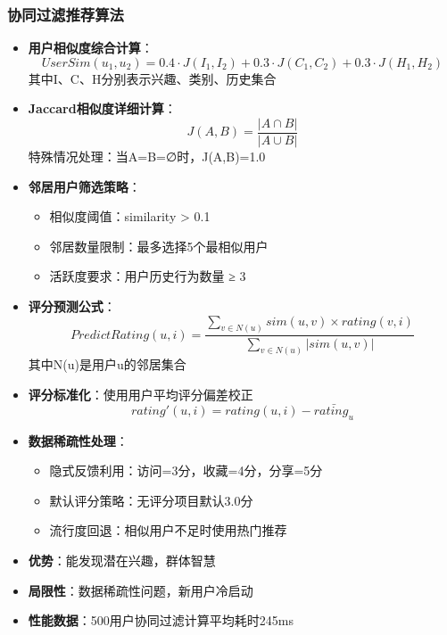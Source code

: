 \documentclass[12pt,a4paper]{article}
\begin{document}
\subsubsection{协同过滤推荐算法}
\begin{itemize}
    \item \textbf{用户相似度综合计算}：
    \[UserSim(u_1, u_2) = 0.4 \cdot J(I_1, I_2) + 0.3 \cdot J(C_1, C_2) + 0.3 \cdot J(H_1, H_2)\]
    其中I、C、H分别表示兴趣、类别、历史集合
    \item \textbf{Jaccard相似度详细计算}：
    \[J(A,B) = \frac{|A \cap B|}{|A \cup B|}\]
    特殊情况处理：当A=B=∅时，J(A,B)=1.0
    \item \textbf{邻居用户筛选策略}：
    \begin{itemize}
        \item 相似度阈值：similarity > 0.1
        \item 邻居数量限制：最多选择5个最相似用户
        \item 活跃度要求：用户历史行为数量 ≥ 3
    \end{itemize}
    \item \textbf{评分预测公式}：
    \[PredictRating(u,i) = \frac{\sum_{v \in N(u)} sim(u,v) \times rating(v,i)}{\sum_{v \in N(u)} |sim(u,v)|}\]
    其中N(u)是用户u的邻居集合
    \item \textbf{评分标准化}：使用用户平均评分偏差校正
    \[rating'(u,i) = rating(u,i) - \bar{rating_u}\]
    \item \textbf{数据稀疏性处理}：
    \begin{itemize}
        \item 隐式反馈利用：访问=3分，收藏=4分，分享=5分
        \item 默认评分策略：无评分项目默认3.0分
        \item 流行度回退：相似用户不足时使用热门推荐
    \end{itemize}
    \item \textbf{优势}：能发现潜在兴趣，群体智慧
    \item \textbf{局限性}：数据稀疏性问题，新用户冷启动
    \item \textbf{性能数据}：500用户协同过滤计算平均耗时245ms
\end{itemize}
\end{document}
